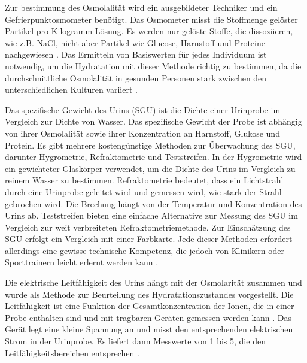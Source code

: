 \documentclass[10pt,a4paper,headinclude,twoside, plainheadsepline, open=right, numbers=noenddot, twocolumn]{article}
\begin{document}
Zur bestimmung des Osmolalität wird ein ausgebildeter Techniker und ein Gefrierpunktosmometer benötigt.
Das Osmometer misst die Stoffmenge gelöster Partikel pro Kilogramm Lösung. 
Es werden nur gelöste Stoffe, die dissoziieren, wie z.B. NaCl, nicht aber Partikel wie Glucose, Harnstoff und Proteine nachgewiesen \cite{oppliger2002hydration}. 
Das Ermitteln von Basiswerten für jedes Individuum ist notwendig, um die Hydratation mit dieser Methode richtig zu bestimmen, da die durchschnittliche Osmolalität in gesunden Personen stark zwischen den unterschiedlichen Kulturen variiert \cite{garret2018engineering}.

Das spezifische Gewicht des Urins (SGU) ist die Dichte einer Urinprobe im Vergleich zur Dichte von Wasser.
Das spezifische Gewicht der Probe ist abhängig von ihrer Osmolalität sowie ihrer Konzentration an Harnstoff, Glukose und Protein. 
Es gibt mehrere kostengünstige Methoden zur Überwachung des SGU, darunter Hygrometrie, Refraktometrie und Teststreifen. 
In der Hygrometrie wird ein gewichteter Glaskörper verwendet, um die Dichte des Urins im Vergleich zu reinem Wasser zu bestimmen.
Refraktometrie bedeutet, dass ein Lichtstrahl durch eine Urinprobe geleitet wird und gemessen wird, wie stark der Strahl gebrochen wird.
Die Brechung hängt von der Temperatur und Konzentration des Urins ab.
Teststreifen bieten eine einfache Alternative zur Messung des SGU im Vergleich zur weit verbreiteten Refraktometriemethode.
Zur Einschätzung des SGU erfolgt ein Vergleich mit einer Farbkarte.
Jede dieser Methoden erfordert allerdings eine gewisse technische Kompetenz, die jedoch von Klinikern oder Sporttrainern leicht erlernt werden kann \cite{oppliger2002hydration}.

Die elektrische Leitfähigkeit des Urins hängt mit der Osmolarität zusammen und wurde als Methode zur Beurteilung des Hydratationszustandes vorgestellt.
Die Leitfähigkeit ist eine Funktion der Gesamtkonzentration der Ionen, die in einer Probe enthalten sind und mit tragbaren Geräten  gemessen werden kann \cite{shirreffs1998urine}.
Das Gerät legt eine kleine Spannung an und misst den entsprechenden elektrischen Strom in der Urinprobe.
Es liefert dann Messwerte von 1 bis 5, die den Leitfähigkeitsbereichen entsprechen \cite{garret2018engineering}.
\end{document}
